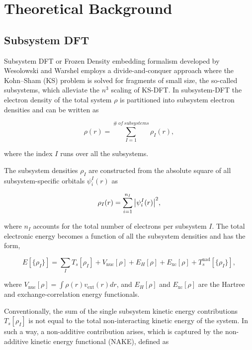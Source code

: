 \documentclass[notitlepage,12pt]{report}
\begin{document}
\section{Theoretical Background}

	\subsection{Subsystem DFT}
	Subsystem DFT or Frozen Density embedding formalism developed by Wesolowski and Warshel employs a divide-and-conquer approach where the Kohn--Sham (KS) problem is solved for fragments of small size, the so-called subsystems, which alleviate the $n^3$ scaling of KS-DFT\supercite{sDFT,wesolowski1993frozen,wesolowski2006one}. In subsystem-DFT the electron density of the total system $\rho$ is partitioned into subsystem electron densities and can be written as

	\begin{equation}\label{eq:sumdensity}
		\rho(r) = \sum\limits_{I=1}^{ \# \ of \ subsystems} \rho_{I}(r),
	\end{equation}

	where the index $I$ runs over all the subsystems.
	
	The subsystem densities $\rho_I$ are constructed from the absolute square of all subsystem-specific orbitals $\psi_{i}^I(r)$ as

	\begin{equation}\label{eq:subso}
		\rho_I( r) = \sum\limits_{i=1}^{n_I} \abs{\psi_{i}^I(r)}^2,
	\end{equation}
	
	where $n_I$ accounts for the total number of electrons per subsystem $I$.
	The total electronic energy becomes a function of all the subsystem densities and has the form,

	\begin{equation}
		E[\{\rho_I\}] = \sum\limits_I T_{s}[\rho_I] + V_{\mathrm{nuc}}[\rho] + E_H[\rho] + E_{\mathrm{xc}}[\rho] + T_{s}^{\mathrm{nad}}[\{\rho_I\}],
	\end{equation}
	
	where $V_{\mathrm{nuc}}[\rho]=\int \rho(r) v_\mathrm{ext}(r)dr$, and $E_H[\rho]$ and $E_{\mathrm{xc}}[\rho]$ are the Hartree  and exchange-correlation energy functionals.
	
	Conventionally, the sum of the single subsystem kinetic energy contributions $T_s[\rho_I]$ is not equal to the total non-interacting kinetic energy of the system. In such a way, a non-additive contribution arises, which is captured by the non-additive kinetic energy functional (NAKE), defined as
\end{document}
